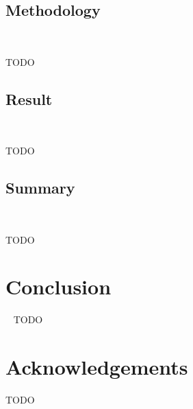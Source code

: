 \documentclass[9pt,conference]{IEEEtran}
\begin{document}
    \subsection{Methodology}~\label{section:case_methodology}

    TODO

    \subsection{Result}~\label{section:case_result}

    TODO

    \subsection{Summary}~\label{section:case_summary}

    TODO

    \section{Conclusion}~\label{section:conclusion}
    TODO

    \section*{Acknowledgements}
    TODO

    
    
\end{document}
